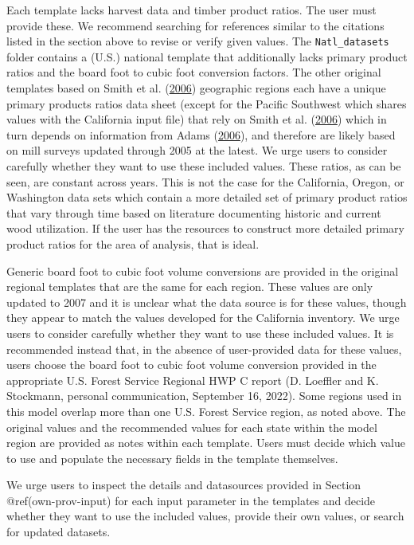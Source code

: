 \documentclass[
  openany]{book}
\begin{document}
Each template lacks harvest data and timber product ratios. The user
must provide these. We recommend searching for references similar to the
citations listed in the section above to revise or verify given values.
The \texttt{Natl\_datasets} folder contains a (U.S.) national template
that additionally lacks primary product ratios and the board foot to
cubic foot conversion factors. The other original templates based on
Smith et al. (\protect\hyperlink{ref-smith2006}{2006}) geographic
regions each have a unique primary products ratios data sheet (except
for the Pacific Southwest which shares values with the California input
file) that rely on Smith et al.
(\protect\hyperlink{ref-smith2006}{2006}) which in turn depends on
information from Adams (\protect\hyperlink{ref-adams2006}{2006}), and
therefore are likely based on mill surveys updated through 2005 at the
latest. We urge users to consider carefully whether they want to use
these included values. These ratios, as can be seen, are constant across
years. This is not the case for the California, Oregon, or Washington
data sets which contain a more detailed set of primary product ratios
that vary through time based on literature documenting historic and
current wood utilization. If the user has the resources to construct
more detailed primary product ratios for the area of analysis, that is
ideal.

Generic board foot to cubic foot volume conversions are provided in the
original regional templates that are the same for each region. These
values are only updated to 2007 and it is unclear what the data source
is for these values, though they appear to match the values developed
for the California inventory. We urge users to consider carefully
whether they want to use these included values. It is recommended
instead that, in the absence of user-provided data for these values,
users choose the board foot to cubic foot volume conversion provided in
the appropriate U.S. Forest Service Regional HWP C report (D. Loeffler
and K. Stockmann, personal communication, September 16, 2022). Some
regions used in this model overlap more than one U.S. Forest Service
region, as noted above. The original values and the recommended values
for each state within the model region are provided as notes within each
template. Users must decide which value to use and populate the
necessary fields in the template themselves.

We urge users to inspect the details and datasources provided in Section
@ref(own-prov-input) for each input parameter in the templates and
decide whether they want to use the included values, provide their own
values, or search for updated datasets.
\end{document}
